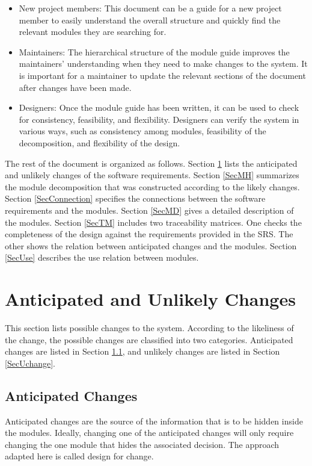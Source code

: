 \documentclass[12pt, titlepage]{article}
\begin{document}
\begin{itemize}
\item New project members: This document can be a guide for a new project member
  to easily understand the overall structure and quickly find the
  relevant modules they are searching for.
\item Maintainers: The hierarchical structure of the module guide improves the
  maintainers' understanding when they need to make changes to the system. It is
  important for a maintainer to update the relevant sections of the document
  after changes have been made.
\item Designers: Once the module guide has been written, it can be used to
  check for consistency, feasibility, and flexibility. Designers can verify the
  system in various ways, such as consistency among modules, feasibility of the
  decomposition, and flexibility of the design.
\end{itemize}

The rest of the document is organized as follows. Section
\ref{SecChange} lists the anticipated and unlikely changes of the software
requirements. Section \ref{SecMH} summarizes the module decomposition that
was constructed according to the likely changes. Section \ref{SecConnection}
specifies the connections between the software requirements and the
modules. Section \ref{SecMD} gives a detailed description of the
modules. Section \ref{SecTM} includes two traceability matrices. One checks
the completeness of the design against the requirements provided in the SRS. The
other shows the relation between anticipated changes and the modules. Section
\ref{SecUse} describes the use relation between modules.

\section{Anticipated and Unlikely Changes} \label{SecChange}

This section lists possible changes to the system. According to the likeliness
of the change, the possible changes are classified into two
categories. Anticipated changes are listed in Section \ref{SecAchange}, and
unlikely changes are listed in Section \ref{SecUchange}.

\subsection{Anticipated Changes} \label{SecAchange}

Anticipated changes are the source of the information that is to be hidden
inside the modules. Ideally, changing one of the anticipated changes will only
require changing the one module that hides the associated decision. The approach
adapted here is called design for change.
\end{document}
